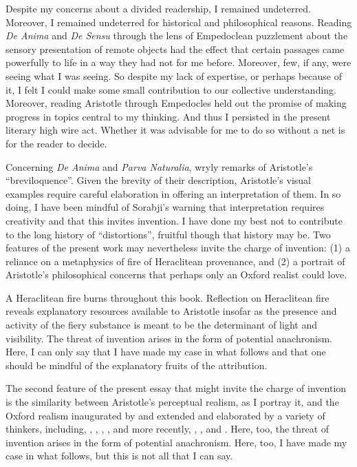 Despite my concerns about a divided readership, I remained undeterred. Moreover, I remained undeterred for historical and philosophical reasons. Reading \emph{De Anima} and \emph{De Sensu} through the lens of Empedoclean puzzlement about the sensory presentation of remote objects had the effect that certain passages came powerfully to life in a way they had not for me before. Moreover, few, if any, were seeing what I was seeing. So despite my lack of expertise, or perhaps because of it, I felt I could make some small contribution to our collective understanding. Moreover, reading Aristotle through Empedocles held out the promise of making progress in topics central to my thinking. And thus I persisted in the present literary high wire act. Whether it was advisable for me to do so without a net is for the reader to decide.

Concerning \emph{De Anima} and \emph{Parva Naturalia}, \citet[vii]{Hammond:1902kx} wryly remarks of Aristotle's ``breviloquence''. Given the brevity of their description, Aristotle's visual examples require careful elaboration in offering an interpretation of them. In so doing, I have been mindful of Sorabji's \citeyearpar[225]{Sorabji:2003fk} warning that interpretation requires creativity and that this invites invention. I have done my best not to contribute to the long history of ``distortions'', fruitful though that history may be. Two features of the present work may nevertheless invite the charge of invention: (1) a reliance on a metaphysics of fire of Heraclitean provenance, and (2) a portrait of Aristotle's philosophical concerns that perhaps only an Oxford realist could love. 

A Heraclitean fire burns throughout this book. Reflection on Heraclitean fire reveals explanatory resources available to Aristotle insofar as the presence and activity of the fiery substance is meant to be the determinant of light and visibility. The threat of invention arises in the form of potential anachronism. Here, I can only say that I have made my case in what follows and that one should be mindful of the explanatory fruits of the attribution. 

The second feature of the present essay that might invite the charge of invention is the similarity between Aristotle's perceptual realism, as I portray it, and the Oxford realism inaugurated by \citet{Cook-Wilson:1926sf} and extended and elaborated by a variety of thinkers, including, \citet{Prichard:1909yg,Prichard:1950kx}, \citet{Ryle:1949qr}, \citet{Austin:1961bs,Austin:1962lr}, \citet{Hinton:1973js}, and more recently, \citet{McDowell:1994am}, \citet{Travis:2008la}, and \citet{Williamson:2000lr}. Here, too, the threat of invention arises in the form of potential anachronism. Here, too, I have made my case in what follows, but this is not all that I can say. 

